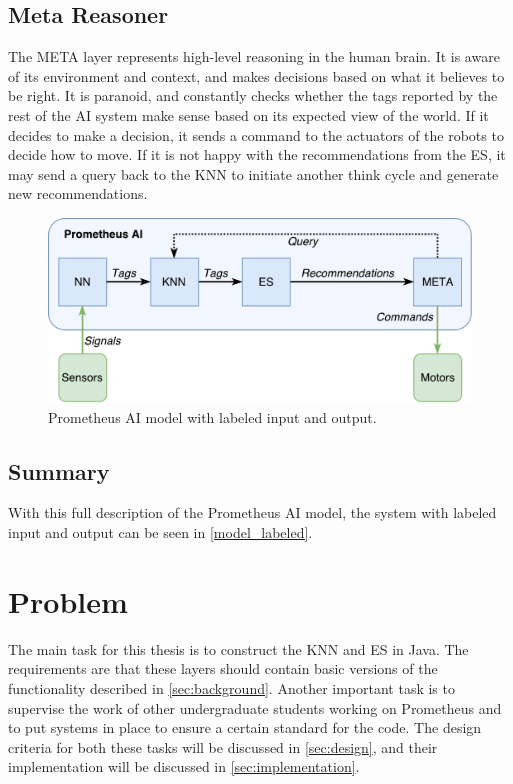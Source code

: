 \documentclass[titlepage,11pt]{article}
\begin{document}
\subsection{Meta Reasoner}

The META layer represents high-level reasoning in the human brain. It is aware of its environment and context, and makes decisions based on what it believes to be right. It is paranoid, and constantly checks whether the tags reported by the rest of the AI system make sense based on its expected view of the world. If it decides to make a decision, it sends a command to the actuators of the robots to decide how to move. If it is not happy with the recommendations from the ES, it may send a query back to the KNN to initiate another think cycle and generate new recommendations.

\begin{figure}[!htb]
	\includegraphics[width=\textwidth]{figures/ai_model_labeled.pdf}
	\caption{Prometheus AI model with labeled input and output.}
	\label{model_labeled}
\end{figure}

\subsection{Summary}

With this full description of the Prometheus AI model, the system with labeled input and output can be seen in \autoref{model_labeled}.

\section{Problem}
\label{sec:problem}

The main task for this thesis is to construct the KNN and ES in Java. The requirements are that these layers should contain basic versions of the functionality described in \autoref{sec:background}. Another important task is to supervise the work of other undergraduate students working on Prometheus and to put systems in place to ensure a certain standard for the code. The design criteria for both these tasks will be discussed in \autoref{sec:design}, and their implementation will be discussed in \cref{sec:implementation}.
\end{document}
